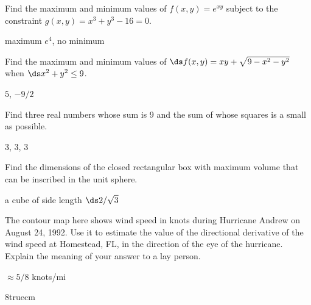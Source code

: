 \begin{exercises}
\exercise Find the maximum and minimum values of $f(x,y)=e^{xy}$ subject
to the constraint $g(x,y) = x^3+y^3 - 16 = 0$.  
\begin{answer} maximum $e^4$, no minimum
\end{answer}

\exercise Find the maximum and minimum values of $\ds f(x,y) = xy +
\sqrt{9-x^2-y^2}$ when $\ds x^2+y^2 \leq 9$.
\begin{answer} $5$, $-9/2$
\end{answer}

\exercise Find three real numbers whose sum is 9 and the sum of whose squares
is a small as possible.  
\begin{answer} $3$, $3$, $3$
\end{answer}

\exercise Find the dimensions of the closed rectangular box with maximum volume
that can be inscribed in the unit sphere.
\begin{answer} a cube of side length $\ds 2/\sqrt{3}$
\end{answer}

\vfill

\exercise The contour map here shows wind speed in knots during Hurricane
Andrew on August 24, 1992.  Use it to estimate the value of the directional
derivative of the wind speed at Homestead, FL, in the direction of the eye
of the hurricane.  Explain the meaning of your answer to a lay person.
\begin{answer} $\approx 5/8$ knots/mi
\end{answer}

\centerline{\epsfxsize8truecm}


\end{exercises}
